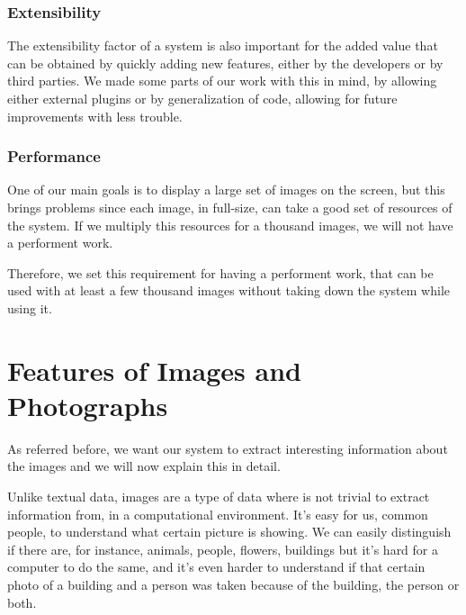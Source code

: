 


\subsubsection{Extensibility} %
\label{reqs:Extensibility}

The extensibility factor of a system is also important for the added value that can be obtained by quickly adding new features, either by the developers or by third parties. We made some parts of our work with this in mind, by allowing either external plugins or by generalization of code, allowing for future improvements with less trouble.




\subsubsection{Performance} %
\label{reqs:Performance}

One of our main goals is to display a large set of images on the screen, but this brings problems since each image, in full-size, can take a good set of resources of the system. If we multiply this resources for a thousand images, we will not have a performent work.

Therefore, we set this requirement for having a performent work, that can be used with at least a few thousand images without taking down the system while using it.







\section{Features of Images and Photographs}
\label{reqs:features}

As referred before, we want our system to extract interesting information about the images and we will now explain this in detail.


Unlike textual data, images are a type of data where is not trivial to extract information from, in a computational environment. It's easy for us, common people, to understand what certain picture is showing. We can easily distinguish if there are, for instance, animals, people, flowers, buildings but it's hard for a computer to do the same, and it's even harder to understand if that certain photo of a building and a person was taken because of the building, the person or both.

